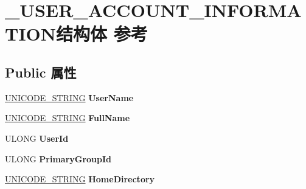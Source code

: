 \hypertarget{struct___u_s_e_r___a_c_c_o_u_n_t___i_n_f_o_r_m_a_t_i_o_n}{}\section{\+\_\+\+U\+S\+E\+R\+\_\+\+A\+C\+C\+O\+U\+N\+T\+\_\+\+I\+N\+F\+O\+R\+M\+A\+T\+I\+O\+N结构体 参考}
\label{struct___u_s_e_r___a_c_c_o_u_n_t___i_n_f_o_r_m_a_t_i_o_n}
\subsection*{Public 属性}
\begin{DoxyCompactItemize}
\item 
\mbox{\label{struct___u_s_e_r___a_c_c_o_u_n_t___i_n_f_o_r_m_a_t_i_o_n_af21431ea672af6345c4bb29cafdeab98}} 
\hyperlink{struct___u_n_i_c_o_d_e___s_t_r_i_n_g}{U\+N\+I\+C\+O\+D\+E\+\_\+\+S\+T\+R\+I\+NG} {\bfseries User\+Name}
\item 
\mbox{\label{struct___u_s_e_r___a_c_c_o_u_n_t___i_n_f_o_r_m_a_t_i_o_n_a09c83ee0125b62333d03fceec18722c0}} 
\hyperlink{struct___u_n_i_c_o_d_e___s_t_r_i_n_g}{U\+N\+I\+C\+O\+D\+E\+\_\+\+S\+T\+R\+I\+NG} {\bfseries Full\+Name}
\item 
\mbox{\label{struct___u_s_e_r___a_c_c_o_u_n_t___i_n_f_o_r_m_a_t_i_o_n_ac3eacbb2f3c416f5c002ababac2001a0}} 
U\+L\+O\+NG {\bfseries User\+Id}
\item 
\mbox{\label{struct___u_s_e_r___a_c_c_o_u_n_t___i_n_f_o_r_m_a_t_i_o_n_a0d982b2aab35a74e078e7ee525c13aae}} 
U\+L\+O\+NG {\bfseries Primary\+Group\+Id}
\item 
\mbox{\label{struct___u_s_e_r___a_c_c_o_u_n_t___i_n_f_o_r_m_a_t_i_o_n_a926e5c4e75f22029a0aa356b15f0197b}} 
\hyperlink{struct___u_n_i_c_o_d_e___s_t_r_i_n_g}{U\+N\+I\+C\+O\+D\+E\+\_\+\+S\+T\+R\+I\+NG} {\bfseries Home\+Directory}
\item 
\mbox{\label{struct___u_s_e_r___a_c_c_o_u_n_t___i_n_f_o_r_m_a_t_i_o_n_ad6efb934e1c675a1bb3c7e7803f62150}} 

\end{DoxyCompactItemize}
